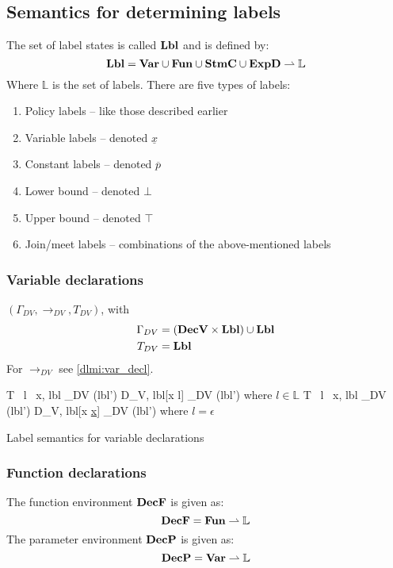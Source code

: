 \subsection{Semantics for determining labels}
The set of label states is called $\mathbf{Lbl}$ and is defined by:
\[
  \mathbf{Lbl} = \mathbf{Var} \cup \mathbf{Fun} \cup \mathbf{StmC} \cup \mathbf{ExpD} \rightharpoonup \mathbb{L}
\]
Where $\mathbb{L}$ is the set of labels.
There are five types of labels:
\begin{enumerate}
  \item Policy labels -- like those described earlier
  \item Variable labels -- denoted $\underline{x}$
  \item Constant labels -- denoted $\overline{p}$
  \item Lower bound -- denoted $\bot$
  \item Upper bound -- denoted $\top$
  \item Join/meet labels -- combinations of the above-mentioned labels
\end{enumerate}

\subsubsection{Variable declarations}
$(\Gamma_{DV}, \rightarrow_{DV}, T_{DV})$, with
\begin{align*}
  \Gamma_{DV} & = (\mathbf{DecV} \times \mathbf{Lbl}) \cup \mathbf{Lbl} \\
  T_{DV} & = \mathbf{Lbl} \\
\end{align*}
For $\rightarrow_{DV}$ see \cref{dlmi:var_decl}.

\begin{table}
        {\langle T \, l \, x, lbl \rangle \rightarrow_{DV} (lbl')}
        {\langle D_V, lbl[x \mapsto l] \rangle \rightarrow_{DV} (lbl')}
        {where $l \in \mathbb{L}$}
        {\langle T \, l \, x, lbl \rangle \rightarrow_{DV} (lbl')}
        {\langle D_V, lbl[x \mapsto \underline{x}] \rangle \rightarrow_{DV} (lbl')}
        {where $l = \epsilon$}
\caption{Label semantics for variable declarations}
\label{dlmi:var_decl}
\end{table}

\subsubsection{Function declarations}
The function environment $\mathbf{DecF}$ is given as:
\[ \mathbf{DecF} = \mathbf{Fun} \rightharpoonup \mathbb{L} \]
The parameter environment $\mathbf{DecP}$ is given as:
\[ \mathbf{DecP} = \mathbf{Var} \rightharpoonup \mathbb{L} \]

